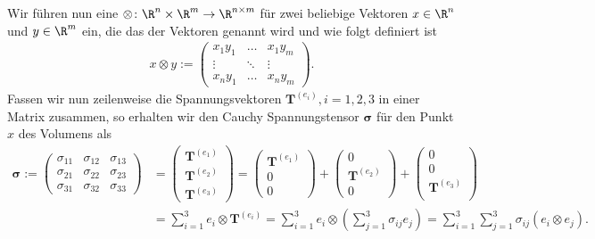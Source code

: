 \documentclass[letterpaper,10pt,english]{jupyterBook}
\begin{document}
\sphinxAtStartPar
Wir führen nun eine  \(\otimes \colon \R^n \times \R^m \rightarrow \R^{n \times m}\) für zwei beliebige Vektoren \(x\in\R^n\) und \(y\in\R^m\) ein, die das  der Vektoren genannt wird und wie folgt definiert ist
\begin{equation*}
\begin{split}x \otimes y := 
\begin{pmatrix}
x_1y_1 &\ldots &x_1 y_m\\
\vdots &\ddots & \vdots\\
x_n y_1&\ldots& x_n y_m
\end{pmatrix}.\end{split}
\end{equation*}
\sphinxAtStartPar
Fassen wir nun zeilenweise die Spannungsvektoren \(\mathbf{T}^{(e_i)}, i=1,2,3\) in einer Matrix zusammen, so erhalten wir den Cauchy Spannungstensor \(\mathbf{\sigma}\) für den Punkt \(x\) des Volumens als
\begin{equation}\label{equation:vektoranalysis/tensor:eq:cauchySpannungstensor}
\begin{split}\mathbf{\sigma} := 
\begin{pmatrix}
\sigma_{11} & \sigma_{12} & \sigma_{13} \\
\sigma_{21} & \sigma_{22} & \sigma_{23} \\
\sigma_{31} & \sigma_{32} & \sigma_{33}
\end{pmatrix} 
&= 
\begin{pmatrix}
\mathbf{T}^{(e_1)} \\
\mathbf{T}^{(e_2)} \\
\mathbf{T}^{(e_3)}
\end{pmatrix}
= 
\begin{pmatrix}
\mathbf{T}^{(e_1)} \\
0 \\
0
\end{pmatrix}
+
\begin{pmatrix}
0 \\
\mathbf{T}^{(e_2)} \\
0
\end{pmatrix}
+
\begin{pmatrix}
0 \\
0 \\
\mathbf{T}^{(e_3)} \\
\end{pmatrix}\\
&=
\sum_{i=1}^3 e_i \otimes \mathbf{T}^{(e_i)} = \sum_{i=1}^3 e_i\otimes ( \sum_{j=1}^3 \sigma_{ij} e_j) =
\sum_{i=1}^3\sum_{j=1}^3 \sigma_{ij} (e_i\otimes e_j).\end{split}
\end{equation}
\end{document}
